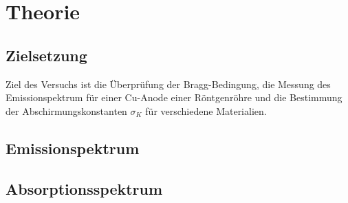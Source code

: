 \section{Theorie}
\label{sec:Theorie}
\subsection{Zielsetzung}
Ziel des Versuchs ist die Überprüfung der Bragg-Bedingung, die Messung des Emissionspektrum für einer Cu-Anode
einer Röntgenröhre und die Bestimmung der Abschirmungskonstanten $\sigma_K$ für verschiedene Materialien.
\subsection{Emissionspektrum}
\subsection{Absorptionsspektrum}
\cite{sample}
